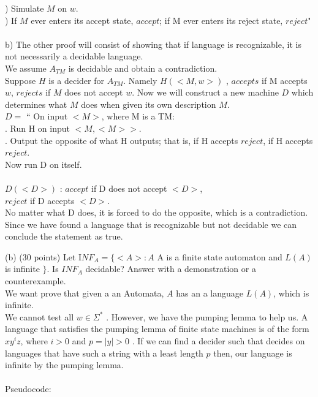 \documentclass{report}
\newcommand{\me}[1]{
\begin{math}
#1
\end{math}
}
\begin{document}
   ) Simulate $M$ on $w$.\\
   ) If $M$ ever enters its accept state, $accept$; if M ever enters its reject state, \indent \indent$reject$" \\ \\
b) The other proof will consist of showing that if language is recognizable, it is not necessarily a decidable language. \\ 
\indent We assume $A_{TM}$ is decidable and obtain a contradiction. \\ 
Suppose $H$ is a decider for $A_{TM}$. Namely \me{H(<M,w>)}, $accepts$ if M accepts $w$, $rejects$ if $M$ does not accept $w$. Now we will construct a new machine $D$ which determines what $M$ does when given its own description $M$. \\
\indent \me{D =} `` On input $<M>$, where M is a TM: \\
\indent {}. Run H on input $<M,<M>>$. \\
\indent {}. Output the opposite of what H outputs; that is, if H accepts $reject$, \indent \indent  if H accepts $reject$.\\ Now run D on itself. \\ \\

\me{D(<D>)}: $accept$ if D does not accept $<D>$, \\ \indent \indent \indent \indent \indent$reject$ if D accepts $<D>$. \\
No matter what D does, it is forced to do the opposite, which is a contradiction. Since we have found a language that is recognizable but not decidable we can conclude the statement as true. 

\newpage

(b) (30 points)  Let I$NF_A =  \{<A>: A $ A is a finite state automaton and \me{L(A)} is infinite $\} $. Is $INF_A$ decidable? Answer with a demonstration or a counterexample. \\


We want prove that given a an Automata, $A$ has an a language $L(A)$, which is infinite. \\ We cannot test all \me{w \in \Sigma^*}. However, we have the pumping lemma to help us. A language that satisfies the pumping lemma of finite state machines is of the form $xy^iz$, where \me{i >0} and \me{p=|y|>0}. If we can find a decider such that decides on languages that have such a string with a least length $p$ then, our language is infinite by the pumping lemma. \\ \\
 Pseudocode:
 
\end{document}
